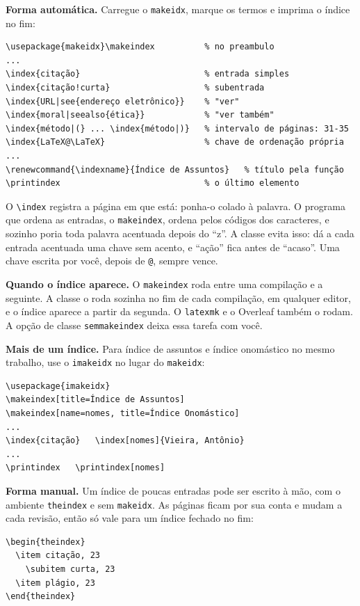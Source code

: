 \documentclass[dsc]{ufrj}
\begin{document}
  \textbf{Forma automática.} Carregue o \texttt{makeidx}, marque os termos e
  imprima o índice no fim:

\begin{verbatim}
\usepackage{makeidx}\makeindex          % no preambulo
...
\index{citação}                         % entrada simples
\index{citação!curta}                   % subentrada
\index{URL|see{endereço eletrônico}}    % "ver"
\index{moral|seealso{ética}}            % "ver também"
\index{método|(} ... \index{método|)}   % intervalo de páginas: 31-35
\index{LaTeX@\LaTeX}                    % chave de ordenação própria
...
\renewcommand{\indexname}{Índice de Assuntos}   % título pela função
\printindex                             % o último elemento
\end{verbatim}

  O \verb|\index| registra a página em que está: ponha-o colado à palavra. O
  programa que ordena as entradas, o \texttt{makeindex}, ordena pelos códigos
  dos caracteres, e sozinho poria toda palavra acentuada depois do ``z''. A
  classe evita isso: dá a cada entrada acentuada uma chave sem acento, e
  ``ação'' fica antes de ``acaso''. Uma chave escrita por você, depois de
  \verb|@|, sempre vence.

  \textbf{Quando o índice aparece.} O \texttt{makeindex} roda entre uma
  compilação e a seguinte. A classe o roda sozinha no fim de cada compilação,
  em qualquer editor, e o índice aparece a partir da segunda. O
  \texttt{latexmk} e o Overleaf também o rodam. A opção de classe
  \texttt{semmakeindex} deixa essa tarefa com você.

  \textbf{Mais de um índice.} Para índice de assuntos e índice onomástico no
  mesmo trabalho, use o \texttt{imakeidx} no lugar do \texttt{makeidx}:

\begin{verbatim}
\usepackage{imakeidx}
\makeindex[title=Índice de Assuntos]
\makeindex[name=nomes, title=Índice Onomástico]
...
\index{citação}   \index[nomes]{Vieira, Antônio}
...
\printindex   \printindex[nomes]
\end{verbatim}

  \textbf{Forma manual.} Um índice de poucas entradas pode ser escrito à mão,
  com o ambiente \verb|theindex| e sem \texttt{makeidx}. As páginas ficam por
  sua conta e mudam a cada revisão, então só vale para um índice fechado no
  fim:

\begin{verbatim}
\begin{theindex}
  \item citação, 23
    \subitem curta, 23
  \item plágio, 23
\end{theindex}
\end{verbatim}
\end{document}

